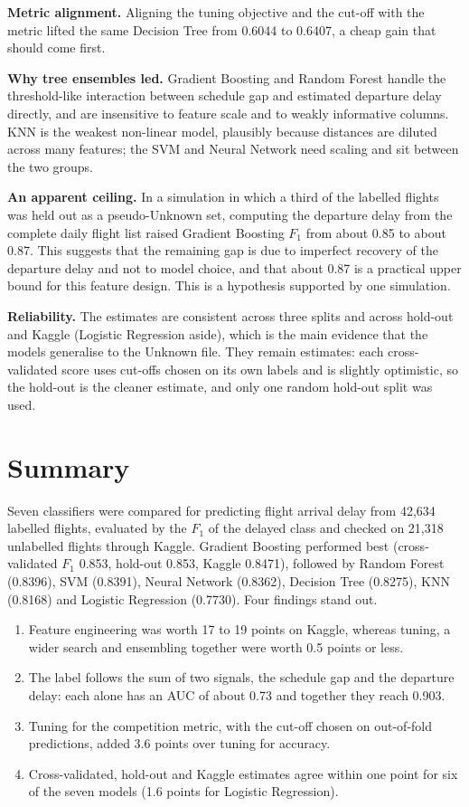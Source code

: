 \documentclass[12pt,a4paper]{article}
\newcommand{\Fone}{$F_1$}
\begin{document}
\textbf{Metric alignment.} Aligning the tuning objective and the cut-off with the metric lifted the same Decision Tree from 0.6044 to 0.6407, a cheap gain that should come first.

\textbf{Why tree ensembles led.} Gradient Boosting and Random Forest handle the threshold-like interaction between schedule gap and estimated departure delay directly, and are insensitive to feature scale and to weakly informative columns. KNN is the weakest non-linear model, plausibly because distances are diluted across many features; the SVM and Neural Network need scaling and sit between the two groups.

\textbf{An apparent ceiling.} In a simulation in which a third of the labelled flights was held out as a pseudo-Unknown set, computing the departure delay from the complete daily flight list raised Gradient Boosting \Fone{} from about 0.85 to about 0.87. This suggests that the remaining gap is due to imperfect recovery of the departure delay and not to model choice, and that about 0.87 is a practical upper bound for this feature design. This is a hypothesis supported by one simulation.

\textbf{Reliability.} The estimates are consistent across three splits and across hold-out and Kaggle (Logistic Regression aside), which is the main evidence that the models generalise to the Unknown file. They remain estimates: each cross-validated score uses cut-offs chosen on its own labels and is slightly optimistic, so the hold-out is the cleaner estimate, and only one random hold-out split was used.

\section{Summary}
Seven classifiers were compared for predicting flight arrival delay from 42,634 labelled flights, evaluated by the \Fone{} of the delayed class and checked on 21,318 unlabelled flights through Kaggle. Gradient Boosting performed best (cross-validated \Fone{} 0.853, hold-out 0.853, Kaggle 0.8471), followed by Random Forest (0.8396), SVM (0.8391), Neural Network (0.8362), Decision Tree (0.8275), KNN (0.8168) and Logistic Regression (0.7730). Four findings stand out.
\begin{enumerate}
\item Feature engineering was worth 17 to 19 points on Kaggle, whereas tuning, a wider search and ensembling together were worth 0.5 points or less.
\item The label follows the sum of two signals, the schedule gap and the departure delay: each alone has an AUC of about 0.73 and together they reach 0.903.
\item Tuning for the competition metric, with the cut-off chosen on out-of-fold predictions, added 3.6 points over tuning for accuracy.
\item Cross-validated, hold-out and Kaggle estimates agree within one point for six of the seven models (1.6 points for Logistic Regression).
\end{enumerate}
\end{document}
